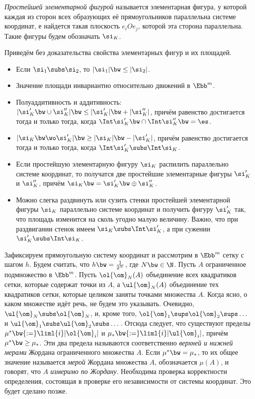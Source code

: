\documentclass[a4paper]{article}
\begin{document}
\begin{df}
\emph{Простейшей элементарной фигурой} называется элементарная фигура, у которой каждая из сторон
всех образующих её прямоугольников параллельна системе координат, е найдется такая плоскость
$e_iOe_j$, которой эта сторона параллельна. Такие фигуры будем обозначать $\si_K$.
\end{df}

Приведём без доказательства свойства элементарных фигур и их площадей.

\begin{itemize}
\setlength\itemsep{-1mm}
\item Если $\si_1 \subs \si_2$, то $|\si_1|\bw\le |\si_2|$.
\item Значение площади инвариантно относительно движений в $\Ebb^m$.
\item Полуаддитивность и аддитивность: $|\si_K' \bw\cup \si_K''| \bw\le |\si_K'| \bw+ |\si_K''|$,
причём равенство достигается тогда и только тогда, когда $\Int \si_K' \bw\cap \Int \si_K'' \bw= \es$.
\item $|\si_K \bw\wo \si_K'| \bw\ge |\si_K|\bw- |\si_K'|$, причём равенство достигается тогда и только тогда,
когда $\Int \si_K' \subs \Int \si_K$.
\item Если простейшую элементарную фигуру $\si_K$ распилить параллельно системе координат, то
получатся две простейшие элементарные фигуры $\si_K'$ и $\si_K''$, причём
$\si_K\bw=\si_K'\bw\oplus\si_K''$.
\item Можно слегка раздвинуть или сузить стенки простейшей элементарной фигуры $\si_K$ параллельно
системе координат и получить фигуру $\si_K'$ так, что площадь изменится на сколь угодно малую
величину. Важно, что при раздвигании стенок имеем $\si_K \subs \Int \si_K'$, а при сужении $\si_K'
\subs \Int \si_K$.
\end{itemize}

\begin{df}
Зафиксируем прямоугольную систему координат и рассмотрим в $\Ebb^m$ сетку с шагом $h$. Будем
считать, что $h\bw=\frac{1}{2^N}$, где $N \bw\in \N$. Пусть $A$ ограниченное подмножество в $\Ebb^m$.
Пусть $\ol{\om}_N(A)$ объединение всех квадратиков сетки, которые содержат точки из $A$, а
$\ul{\om}_N(A)$ объединение тех квадратиков сетки, которые целиком заняты точками множества $A$.
Когда ясно, о каком множестве идёт речь, не будем это указывать. Очевидно, $\ul{\om}_N \subs
\ol{\om}_N$, и, кроме того, $\ol{\om}_1 \sups \ol{\om}_2 \sups \dots$ и $\ul{\om}_1 \subs
\ul{\om}_2 \subs \dots$. Отсюда следует, что существуют пределы $\mu^* \bw{:=}
\liml{i}|\ol{\om}_i|$ и $\mu_* \bw{:=} \liml{i}|\ul{\om}_i|$, причём $\mu^* \bw\ge \mu_*$. Эти два
предела называются соответственно \emph{верхней и нижней мерами} Жордана ограниченного множества
$A$. Если $\mu^*\bw=\mu_*$, то их общее значение называется \emph{мерой} Жордана множества $A$,
обозначается $\mu(A)$, и говорят, что $A$ \emph{измеримо по Жордану}. Необходима проверка
корректности определения, состоящая в проверке его независимости от системы координат. Это будет
сделано позже.
\end{df}
\end{document}
